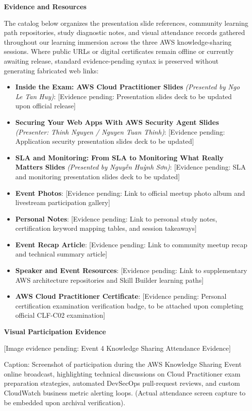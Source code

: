 \vspace{0.5em}\noindent\textbf{Evidence and Resources}\par

The catalog below organizes the presentation slide references, community
learning path repositories, study diagnostic notes, and visual
attendance records gathered throughout our learning immersion across the
three AWS knowledge-sharing sessions. Where public URLs or digital
certificates remain offline or currently awaiting release, standard
evidence-pending syntax is preserved without generating fabricated web
links:

\begin{itemize}
\tightlist
\item
  \textbf{Inside the Exam: AWS Cloud Practitioner Slides}
  \emph{(Presented by Ngo Le Tan Huy)}: {[}Evidence pending:
  Presentation slides deck to be updated upon official release{]}
\item
  \textbf{Securing Your Web Apps With AWS Security Agent Slides}
  \emph{(Presenter: Thinh Nguyen / Nguyen Tuan Thinh)}: {[}Evidence
  pending: Application security presentation slides deck to be
  updated{]}
\item
  \textbf{SLA and Monitoring: From SLA to Monitoring What Really Matters
  Slides} \emph{(Presented by Nguyễn Huỳnh Sơn)}: {[}Evidence pending:
  SLA and monitoring presentation slides deck to be updated{]}
\item
  \textbf{Event Photos}: {[}Evidence pending: Link to official meetup
  photo album and livestream participation gallery{]}
\item
  \textbf{Personal Notes}: {[}Evidence pending: Link to personal study
  notes, certification keyword mapping tables, and session takeaways{]}
\item
  \textbf{Event Recap Article}: {[}Evidence pending: Link to community
  meetup recap and technical summary article{]}
\item
  \textbf{Speaker and Event Resources}: {[}Evidence pending: Link to
  supplementary AWS architecture repositories and Skill Builder learning
  paths{]}
\item
  \textbf{AWS Cloud Practitioner Certificate}: {[}Evidence pending:
  Personal certification examination verification badge, to be attached
  upon completing official CLF-C02 examination{]}
\end{itemize}

\vspace{0.5em}\noindent\textbf{Visual Participation
Evidence}\par

{[}Image evidence pending: Event 4 Knowledge Sharing Attendance
Evidence{]}

Caption: Screenshot of participation during the AWS Knowledge Sharing
Event online broadcast, highlighting technical discussions on Cloud
Practitioner exam preparation strategies, automated DevSecOps
pull-request reviews, and custom CloudWatch business metric alerting
loops. (Actual attendance screen capture to be embedded upon archival
verification).
